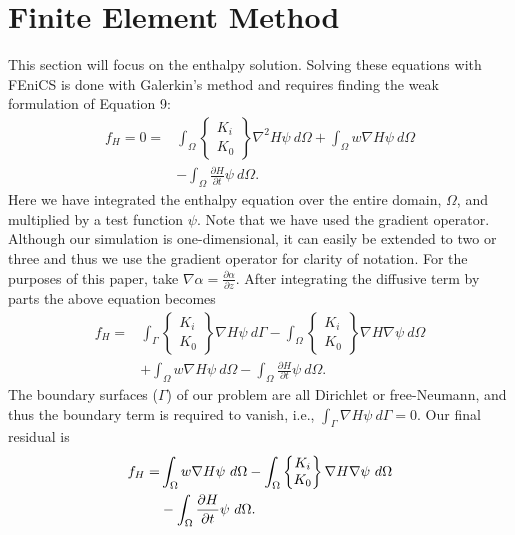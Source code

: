 \documentclass{article}%
\begin{document}
\section{Finite Element Method}

This section will focus on the enthalpy solution.  Solving these equations with FEniCS is done with Galerkin's method and requires finding the weak formulation of Equation 9:
\begin{align*}
    f_H = 0 =
    &\int_{\Omega} 
      \begin{Bmatrix}
        K_i\\
        K_0
      \end{Bmatrix}
      \nabla^2 H \psi\ d \Omega 
    + \int_{\Omega} w \nabla H \psi\ d \Omega \\
    &- \int_{\Omega} {\frac{\partial H}{\partial t}} \psi\ d \Omega.
\end{align*}
Here we have integrated the enthalpy equation over the entire domain, $\Omega$, and multiplied by a test function $\psi$.  Note that we have used the gradient operator.  Although our simulation is one-dimensional, it can easily be extended to two or three and thus we use the gradient operator for clarity of notation.  For the purposes of this paper, take $\nabla{\alpha} = \frac{\partial \alpha}{\partial z}$.  After integrating the diffusive term by parts the above equation becomes
\begin{align*}
    f_H =
    & \int_{\Gamma} 
        \begin{Bmatrix}
          K_i\\
          K_0
        \end{Bmatrix}
        \nabla H \psi\ d \Gamma
    - \int_{\Omega} 
        \begin{Bmatrix}
          K_i\\
          K_0
        \end{Bmatrix}
        \nabla H \nabla \psi\ d\Omega \\ 
    &+ \int_{\Omega}w \nabla H \psi\ d\Omega
    - \int_{\Omega} {\frac{\partial H}{\partial t}} \psi\ d\Omega.
\end{align*}
The boundary surfaces ($\Gamma$) of our problem are all Dirichlet or free-Neumann, and thus the boundary term is required to vanish, i.e., $\int_{\Gamma} \nabla H \psi\ d \Gamma = 0$.  Our final residual is
\begin{align}
    f_H =
    &\int_{\Omega}w \nabla H \psi\ d\Omega
    - \int_{\Omega} 
        \begin{Bmatrix}
          K_i\\
          K_0
        \end{Bmatrix}
        \nabla H \nabla \psi\ d \Omega \notag \\ 
    &- \int_{\Omega} {\frac{\partial H}{\partial t}} \psi\ d \Omega.
\end{align}
\end{document}
